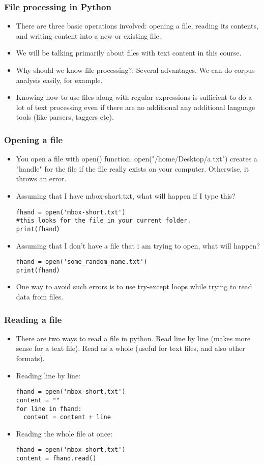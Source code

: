 \documentclass{beamer}
\begin{document}
\begin{frame}[fragile]
\frametitle{File processing in Python}
\begin{itemize}
\item There are three basic operations involved: opening a file, reading its contents, and writing content into a new or existing file.
\item We will be talking primarily about files with text content in this course.
\item Why should we know file processing?: Several advantages. We can do corpus analysis easily, for example.
\item Knowing how to use files along with regular expressions is sufficient to do a lot of text processing even if there are no additional any additional language tools (like parsers, taggers etc).
\end{itemize}
\end{frame}

\begin{frame}[fragile]
\frametitle{Opening a file}
\begin{itemize}
\item You open a file with open() function. open("/home/Desktop/a.txt") creates a "handle" for the file if the file really exists on your computer. Otherwise, it throws an error.
\item Assuming that I have mbox-short.txt, what will happen if I type this?
\scriptsize
\begin{verbatim}
fhand = open('mbox-short.txt') 
#this looks for the file in your current folder.
print(fhand)
\end{verbatim} \pause \normalsize
\item Assuming that I don't have a file that i am trying to open, what will happen?
\scriptsize
\begin{verbatim}
fhand = open('some_random_name.txt') 
print(fhand)
\end{verbatim} \normalsize \pause
\item One way to avoid such errors is to use try-except loops while trying to read data from files.
\end{itemize}
\end{frame}

\begin{frame}[fragile]
\frametitle{Reading a file}
\begin{itemize}
\item There are two ways to read a file in python. Read line by line (makes more sense for a text file). Read as a whole (useful for text files, and also other formats).
\item Reading line by line:
\begin{verbatim}
fhand = open('mbox-short.txt')
content = "" 
for line in fhand:
  content = content + line
\end{verbatim}
\item Reading the whole file at once:
\begin{verbatim}
fhand = open('mbox-short.txt') 
content = fhand.read()
\end{verbatim}
\end{itemize}
\end{frame}
\end{document}
